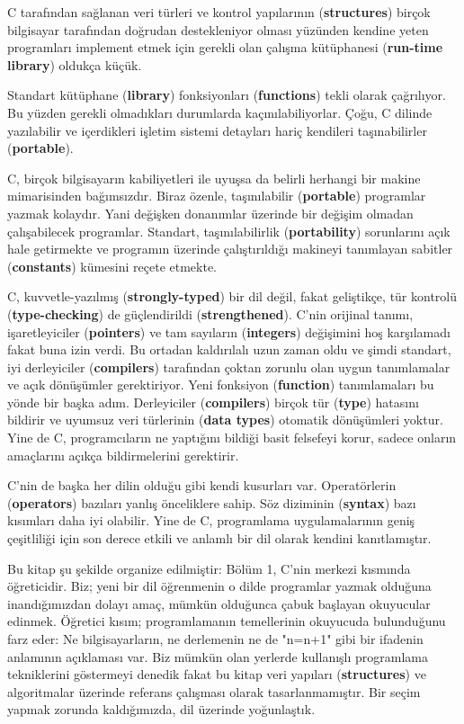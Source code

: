 \documentclass[a4paper,12pt,oneside]{book}
\begin{document}
\par C tarafından sağlanan veri türleri ve kontrol yapılarının (\textbf{structures}) birçok bilgisayar tarafından doğrudan destekleniyor olması yüzünden kendine yeten programları implement etmek için gerekli olan çalışma kütüphanesi (\textbf{run-time library}) oldukça küçük. \pagebreak

\noindent \thispagestyle{introduction} Standart kütüphane (\textbf{library}) fonksiyonları (\textbf{functions}) tekli olarak çağrılıyor. Bu yüzden gerekli olmadıkları durumlarda kaçınılabiliyorlar. Çoğu, C dilinde yazılabilir ve içerdikleri işletim sistemi detayları hariç kendileri taşınabilirler (\textbf{portable}).
\par C, birçok bilgisayarın kabiliyetleri ile uyuşsa da belirli herhangi bir makine mimarisinden bağımsızdır. Biraz özenle, taşınılabilir (\textbf{portable}) programlar yazmak kolaydır. Yani değişken donanımlar üzerinde bir değişim olmadan çalışabilecek programlar. Standart, taşınılabilirlik (\textbf{portability}) sorunlarını açık hale getirmekte ve programın üzerinde çalıştırıldığı makineyi tanımlayan sabitler (\textbf{constants}) kümesini reçete etmekte.
\par C, kuvvetle-yazılmış (\textbf{strongly-typed}) bir dil değil, fakat geliştikçe, tür kontrolü (\textbf{type-checking}) de güçlendirildi (\textbf{strengthened}). C'nin orijinal tanımı, işaretleyiciler (\textbf{pointers}) ve tam sayıların (\textbf{integers}) değişimini hoş karşılamadı fakat buna izin verdi. Bu ortadan kaldırılalı uzun zaman oldu ve şimdi standart, iyi derleyiciler (\textbf{compilers}) tarafından çoktan zorunlu olan uygun tanımlamalar ve açık dönüşümler gerektiriyor. Yeni fonksiyon (\textbf{function}) tanımlamaları bu yönde bir başka adım. Derleyiciler (\textbf{compilers}) birçok tür (\textbf{type}) hatasını bildirir ve uyumsuz veri türlerinin (\textbf{data types}) otomatik dönüşümleri yoktur. Yine de C, programcıların ne yaptığını bildiği basit felsefeyi korur, sadece onların amaçlarını açıkça bildirmelerini gerektirir.
\par C'nin de başka her dilin olduğu gibi kendi kusurları var. Operatörlerin (\textbf{operators}) bazıları yanlış önceliklere sahip. Söz diziminin (\textbf{syntax}) bazı kısımları daha iyi olabilir. Yine de C, programlama uygulamalarının geniş çeşitliliği için son derece etkili ve anlamlı bir dil olarak kendini kanıtlamıştır.
\par Bu kitap şu şekilde organize edilmiştir: Bölüm 1, C'nin merkezi kısmında öğreticidir. Biz; yeni bir dil öğrenmenin o dilde programlar yazmak olduğuna inandığımızdan dolayı amaç, mümkün olduğunca çabuk başlayan okuyucular edinmek. Öğretici kısım; programlamanın temellerinin okuyucuda bulunduğunu farz eder: Ne bilgisayarların, ne derlemenin ne de "n=n+1" gibi bir ifadenin anlamının açıklaması var. Biz mümkün olan yerlerde kullanışlı programlama tekniklerini göstermeyi denedik fakat bu kitap veri yapıları (\textbf{structures}) ve algoritmalar üzerinde referans çalışması olarak tasarlanmamıştır. Bir seçim yapmak zorunda kaldığımızda, dil üzerinde yoğunlaştık.
\end{document}
